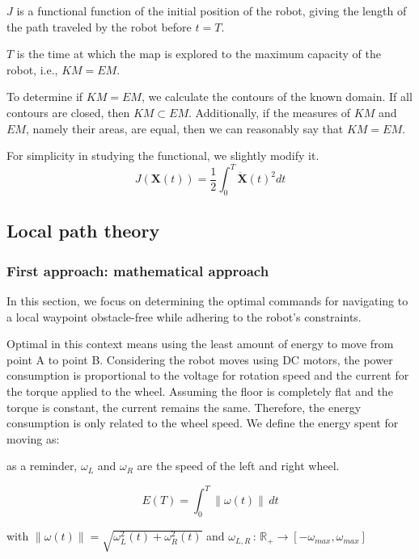 \documentclass[../main.tex]{subfiles}
\begin{document}
$J$ is a functional function of the initial position of the robot, giving the length of the path traveled by the robot before $t = T$.
\vspace{0.5em}

$T$ is the time at which the map is explored to the maximum capacity of the robot, i.e., $KM = EM$.
\vspace{0.5em}

To determine if $KM = EM$, we calculate the contours of the known domain. If all contours are closed, then $KM \subset EM$. Additionally, if the measures of $KM$ and $EM$, namely their areas, are equal, then we can reasonably say that $KM = EM$.
\vspace{0.5em}

For simplicity in studying the functional, we slightly modify it.
\begin{equation}
	\displaystyle
	J(\mathbf{X}(t)) = \frac{1}{2} \int_{0}^{T} \mathbf{\dot{X}}(t)^{2} dt
\end{equation}

\subsection{Local path theory}

\subsubsection{First approach: mathematical approach}

In this section, we focus on determining the optimal commands for navigating to a local waypoint obstacle-free while adhering to the robot's constraints. 

Optimal in this context means using the least amount of energy to move from point A to point B. Considering the robot moves using DC motors, the power consumption is proportional to the voltage for rotation speed and the current for the torque applied to the wheel. Assuming the floor is completely flat and the torque is constant, the current remains the same. Therefore, the energy consumption is only related to the wheel speed. We define the energy spent for moving as:

as a reminder, $\omega_L$ and $\omega_R$ are the speed of the left and right wheel.

$$
\displaystyle E(T) = \int_{0}^{T} \| \omega(t) \| \, dt
$$

with $\displaystyle \| \omega (t) \| = \sqrt{\omega_L^{2}(t) + \omega_R^{2}(t)}$ and  $\omega_{L, R} \,:\, \mathbb{R}_+ \longrightarrow [-\omega_{max}, \omega_{max}]$ 
\end{document}
